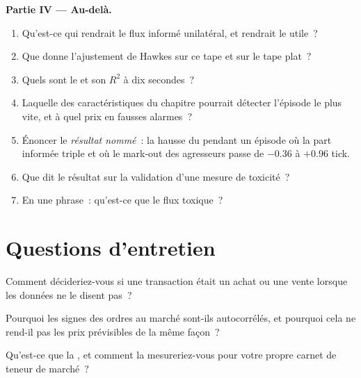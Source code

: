 \begin{problem}
\medskip\noindent\textbf{Partie IV --- Au-delà.}
\begin{enumerate}[resume]
\item Qu'est-ce qui rendrait le flux informé unilatéral, et rendrait le  utile~?
\item Que donne l'ajustement de Hawkes sur ce tape et sur le tape plat~?
\item Quels sont le  et son $R^2$ à dix secondes~?
\item Laquelle des caractéristiques du chapitre pourrait détecter l'épisode le plus vite, et à quel prix en fausses alarmes~?
\item Énoncer le \emph{résultat nommé}~: la hausse du  pendant un épisode où la part informée triple et où le mark-out des agresseurs passe
de $-0.36$ à $+0.96$ tick.
\item Que dit le résultat sur la validation d'une mesure de toxicité~?
\item En une phrase~: qu'est-ce que le flux toxique~?
\end{enumerate}
\end{problem}

\section{Questions d'entretien}

\begin{interviewq}\label{iq:rs:trade-flow-features:1}
Comment décideriez-vous si une transaction était un achat ou une vente lorsque les données ne le disent pas~?
\end{interviewq}

\begin{interviewq}\label{iq:rs:trade-flow-features:2}
Pourquoi les signes des ordres au marché sont-ils autocorrélés, et pourquoi cela ne rend-il pas les prix prévisibles de la même façon~?
\end{interviewq}

\begin{interviewq}\label{iq:rs:trade-flow-features:3}
Qu'est-ce que la , et comment la mesureriez-vous pour votre propre carnet de teneur de marché~?
\end{interviewq}

